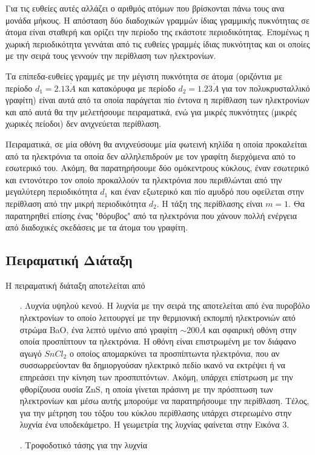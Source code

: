 \documentclass[a4paper]{article}
\begin{document}
 Για τις ευθείες αυτές αλλάζει ο αριθμός ατόμων που βρίσκονται πάνω τους ανα μονάδα μήκους. Η απόσταση δύο διαδοχικών γραμμών ίδιας γραμμικής πυκνότητας σε άτομα είναι σταθερή και ορίζει την περίοδο της εκάστοτε περιοδικότητας. Επομένως η χωρική περιοδικότητα γεννάται από τις ευθείες γραμμές ίδιας πυκνότητας και οι οποίες με την σειρά τους γεννούν την περίθλαση των ηλεκτρονίων.

 Τα επίπεδα-ευθείες γραμμές με την μέγιστη πυκνότητα σε άτομα (οριζόντια με περίοδο $d_1=2.13\mathring{A}$ και κατακόρυφα με περίοδο $d_2=1.23\mathring{A}$ για τον πολυκρυσταλλικό γραφίτη) είναι αυτά από τα οποία παράγεται πίο έντονα η περίθλαση των ηλεκτρονίων και από αυτά θα την μελετήσουμε πειραματικά, ενώ για μικρές πυκνότητες (μικρές χωρικές πείοδοι) δεν ανιχνεύεται περίθλαση.

Πειραματικά, σε μία οθόνη θα ανιχνεύσουμε μία φωτεινή κηλίδα η οποία προκαλείται από τα ηλεκτρόνια τα οποία δεν αλληλεπιδρούν με τον γραφίτη διερχόμενα από το εσωτερικό του. Ακόμη, θα παρατηρήσουμε δύο ομόκεντρους κύκλους, έναν εσωτερικό και εντονότερο τον οποίο προκαλλούν τα ηλεκτρόνια που περιθλώνται από την μεγαλύτερη περιοδικότητα $d_1$ και έναν εξωτερικό και πίο αμυδρό που οφείλεται στην περίθλαση από την μικρή περιοδικότητα $d_2$. Η τάξη της περίθλασης είναι $m=1$. Θα παρατηρηθεί επίσης ένας "θόρυβος" από τα ηλεκτρόνια που χάνουν πολλή ενέργεια από διαδοχικές σκεδάσεις με τα άτομα του γραφίτη.

\subsection*{Πειραματική Διάταξη}
Η πειραματική διάταξη αποτελείται από
\begin{itemize}
\item[.] Λυχνία υψηλού κενού. Η λυχνία με την σειρά της αποτελείται από ένα πυροβόλο ηλεκτρονίων το οποίο λειτουργεί με την θερμιονική εκπομπή ηλεκτρονιών από στρώμα BaO, ένα λεπτό υμένιο από γραφίτη $\sim200\mathring{A}$ και σφαιρική οθόνη στην οποία προσπίπτουν τα ηλεκτρόνια. Η οθόνη είναι επιστρωμένη με τον διάφανο αγωγό $SnCl_2$ ο οποίος απομαρκύνει τα προσπίπτωντα ηλεκτρόνια, που αν συσσωρρεύονταν θα δημιοργούσαν ηλεκτρικό πεδίο ικανό να εκτρέψει ή να επηρεάσει την κίνηση των προσπιπτόντων.
Ακόμη, υπάρχει επίστρωση με την φθορίζουσα ουσία ZnS, η οποία γίνεται πράσινη με την πρόσπτωση των ηλεκτρονίων και μέσω αυτής μπορούμε να παρατηρήσουμε την περίθλαση. Τέλος, για την μέτρηση του τόξου του κύκλου περίθλασης υπάρχει στερεωμένο στην λυχνία ένα υποδεκάμετρο. Η γεωμετρία της λυχνίας φαίνεται στην Εικόνα 3. 
\item[.] Τροφοδοτικό τάσης για την λυχνία
\end{itemize}
\end{document}
